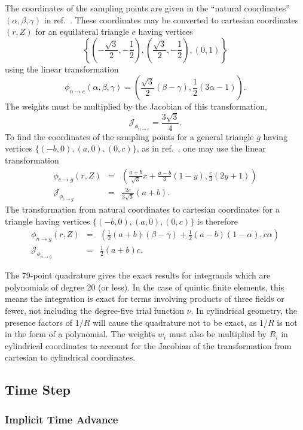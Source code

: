 The coordinates of the sampling points are given in the ``natural
coordinates'' $(\alpha, \beta, \gamma)$ in ref.~\cite{Dunavant85}.
These coordinates may be converted to cartesian coordinates $(r, Z)$
for an equilateral triangle $e$ having vertices
\[
\left\{\left(-\frac{\sqrt{3}}{2},-\frac{1}{2}\right),
\left(\frac{\sqrt{3}}{2},-\frac{1}{2}\right), (0,1)\right\} 
\]
using the linear transformation
\[ 
\phi_{n \to e}(\alpha, \beta, \gamma) = 
\left(\frac{\sqrt{3}}{2}(\beta-\gamma), \frac{1}{2}(3 \alpha - 1)
\right).
\]
The weights must be multiplied by the Jacobian of this transformation,
\[
\mathcal{J}_{\phi_{n \to e}} = \frac{3 \sqrt{3}}{4}.
\]
To find the coordinates of the sampling points for a general triangle
$g$ having vertices $\{(-b,0), (a,0), (0,c)\}$, as in
ref.~\cite{Jardin04}, one may use the linear transformation
\begin{eqnarray*}
  \phi_{e \to g}(r,Z) & = & 
    \left(\frac{a+b}{\sqrt{3}} x + \frac{a-b}{3} (1-y), 
    \frac{c}{3}(2y+1) \right) \\
  \mathcal{J}_{\phi_{e \to g}} & = &  \frac{2 c}{3 \sqrt{3}} (a+b).
\end{eqnarray*}
The transformation from natural coordinates to cartesian coordinates
for a triangle having vertices $\{(-b,0), (a,0), (0,c)\}$ is therefore
\begin{eqnarray*}
  \phi_{n \to g}(r,Z) & = & 
  \left(\frac{1}{2} (a+b) (\beta-\gamma) +
  \frac{1}{2} (a-b)(1-\alpha), c \alpha \right) \\
  \mathcal{J}_{\phi_{n \to g}} & = & \frac{1}{2} (a+b) c.
\end{eqnarray*}

The 79-point quadrature gives the exact results for integrands which
are polynomials of degree 20 (or less).  In the case of quintic finite
elements, this means the integration is exact for terms involving
products of three fields or fewer, not including the degree-five
trial function $\nu$.  In cylindrical geometry, the presence factors
of $1/R$ will cause the quadrature not to be exact, as $1/R$ is not in
the form of a polynomial.  The weights $w_i$ must also be multiplied
by $R_i$ in cylindrical coordinates to account for the Jacobian of the
transformation from cartesian to cylindrical coordinates.


\subsection{Time Step}

\subsubsection{Implicit Time Advance}

